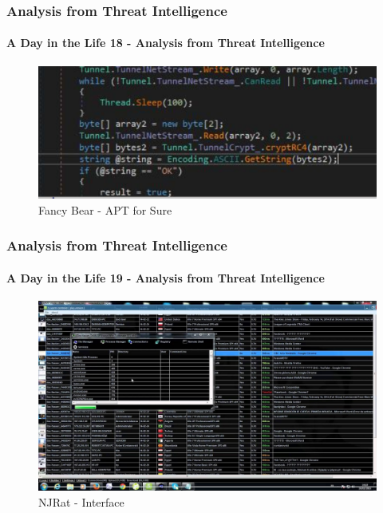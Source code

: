 \documentclass[aspectratio=169]{beamer}
\begin{document}
\begin{frame}
  \frametitle{Analysis from Threat Intelligence}
  \framesubtitle{A Day in the Life 18 - Analysis from Threat Intelligence}
  \begin{center}
    \begin{figure}
      \includegraphics[width=14cm,keepaspectratio]{fancy_bear_analysis_9}
      \caption{Fancy Bear - APT for Sure}
    \end{figure}
  \end{center}
\end{frame}

\begin{frame}
  \frametitle{Analysis from Threat Intelligence}
  \framesubtitle{A Day in the Life 19 - Analysis from Threat Intelligence}
  \begin{center}
    \begin{figure}
      \includegraphics[width=14cm,keepaspectratio]{njrat}
      \caption{NJRat - Interface}
    \end{figure}
  \end{center}
\end{frame}
\end{document}
